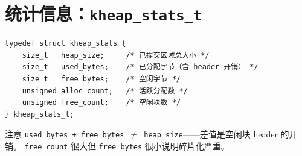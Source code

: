 \section{统计信息：\texttt{kheap\_stats\_t}}

\begin{lstlisting}[style=cstyle]
typedef struct kheap_stats {
    size_t   heap_size;     /* 已提交区域总大小 */
    size_t   used_bytes;    /* 已分配字节（含 header 开销） */
    size_t   free_bytes;    /* 空闲字节 */
    unsigned alloc_count;   /* 活跃分配数 */
    unsigned free_count;    /* 空闲块数 */
} kheap_stats_t;
\end{lstlisting}

注意 \texttt{used\_bytes + free\_bytes $\neq$ heap\_size}——差值是空闲块 header 的开销。
\texttt{free\_count} 很大但 \texttt{free\_bytes} 很小说明碎片化严重。


